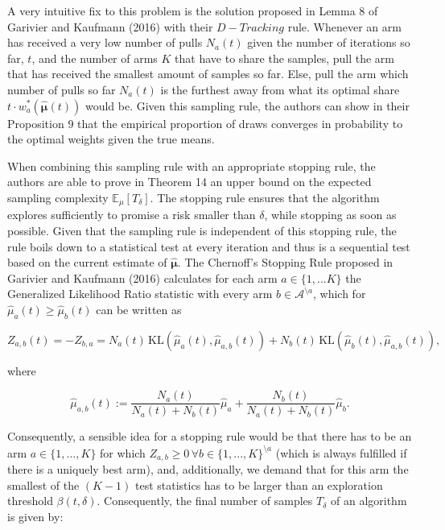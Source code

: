 \documentclass[11pt,]{article}
\newcommand{\KL}{\,\text{KL}}
\begin{document}
A very intuitive fix to this problem is the solution proposed in Lemma 8
of Garivier and Kaufmann (2016) with their \(D-Tracking\) rule. Whenever
an arm has received a very low number of pulls \(N_a(t)\) given the
number of iterations so far, \(t\), and the number of arms \(K\) that
have to share the samples, pull the arm that has received the smallest
amount of samples so far. Else, pull the arm which number of pulls so
far \(N_a(t)\) is the furthest away from what its optimal share
\(t\cdot w^*_a(\hat{\bm{\mu}}(t))\) would be. Given this sampling rule,
the authors can show in their Proposition 9 that the empirical
proportion of draws converges in probability to the optimal weights
given the true means.

When combining this sampling rule with an appropriate stopping rule, the
authors are able to prove in Theorem 14 an upper bound on the expected
sampling complexity \(\mathbb{E}_{\mu}[T_{\delta}]\). The stopping rule
ensures that the algorithm explores sufficiently to promise a risk
smaller than \(\delta\), while stopping as soon as possible. Given that
the sampling rule is independent of this stopping rule, the rule boils
down to a statistical test at every iteration and thus is a sequential
test based on the current estimate of \(\hat{\bm{\mu}}\). The Chernoff's
Stopping Rule proposed in Garivier and Kaufmann (2016) calculates for
each arm \(a\in \{1,...K\}\) the Generalized Likelihood Ratio statistic
with every arm \(b \in \mathcal{A}^{\setminus a}\), which for
\(\hat{\mu}_a(t) \geq \hat{\mu}_b(t)\) can be written as

\begin{equation*}
Z_{a,b}(t) = - Z_{b,a} = N_a(t) \KL(\hat{\mu}_a(t),\hat{\mu}_{a,b}(t)) + N_b(t) \KL(\hat{\mu}_{b}(t), \hat{\mu}_{a,b}(t)),
\end{equation*}

where

\begin{equation*}
\hat{\mu}_{a,b}(t) := \frac{N_a(t)}{N_a(t) + N_b(t)}\hat{\mu}_a + \frac{N_b(t)}{N_a(t) + N_b(t)}\hat{\mu}_b.
\end{equation*}

Consequently, a sensible idea for a stopping rule would be that there
has to be an arm \(a \in \{1,...,K\}\) for which
\(Z_{a,b} \geq 0 \, \forall b \in \{1,...,K\}^{\setminus a}\) (which is
always fulfilled if there is a uniquely best arm), and, additionally, we
demand that for this arm the smallest of the \((K-1)\) test statistics
has to be larger than an exploration threshold \(\beta(t, \delta)\).
Consequently, the final number of samples \(T_{\delta}\) of an algorithm
is given by:
\end{document}
